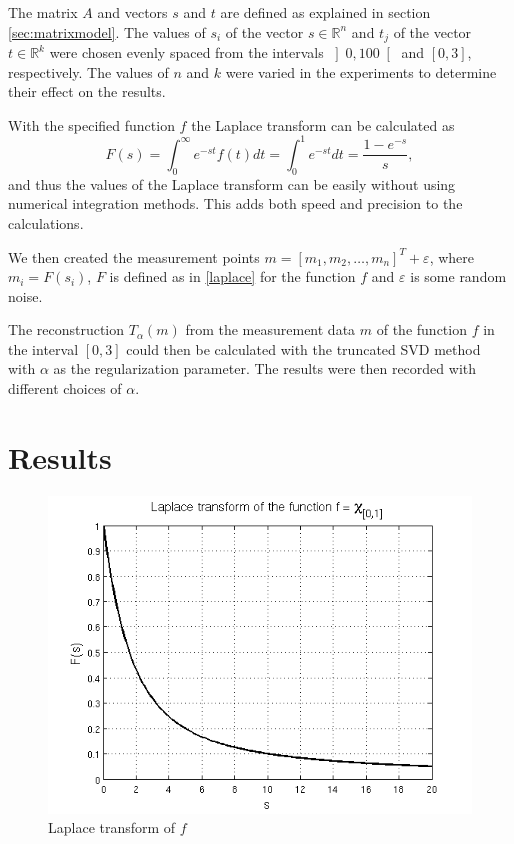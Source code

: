 \documentclass[12pt,a4]{article}
\newcommand{\R}{{\mathbb R}}
\newcommand{\eps}{\varepsilon}
\begin{document}
The matrix $A$ and vectors $s$ and $t$ are defined as explained in section \ref{sec:matrixmodel}. The values of $s_i$ of the vector $s \in \R^n$ and $t_j$ of the vector $t \in \R^k$ were chosen evenly spaced from the intervals $\left] 0, 100 \right[$ and $\left[ 0,3 \right]$, respectively. The values of $n$ and $k$ were varied in the experiments to determine their effect on the results.

With the specified function $f$ the Laplace transform can be calculated as
\begin{equation}
F(s) = \int_0^{\infty} e^{-st} f(t) dt
     = \int_0^1 e^{-st} dt
     = \frac{1 - e^{-s}}{s},
\end{equation}
and thus the values of the Laplace transform can be easily without using numerical integration methods. This adds both speed and precision to the calculations.

We then created the measurement points $m = [m_1, m_2, \ldots, m_n]^T + \eps$, where $m_i = F(s_i)$, $F$ is defined as in \eqref{laplace} for the function $f$ and $\eps$ is some random noise.

The reconstruction $T_\alpha(m)$ from the measurement data $m$ of the function $f$ in the interval $\left[0,3\right]$ could then be calculated with the truncated SVD method with $\alpha$ as the regularization parameter. The results were then recorded with different choices of $\alpha$.



\section{Results}\label{sec:results}

\begin{figure}[t]
\begin{center}
\includegraphics[scale=.6]{img/laplace.png}
\end{center}
\caption{Laplace transform of $f$}
\label{fig:laplace}
\end{figure}
\end{document}
